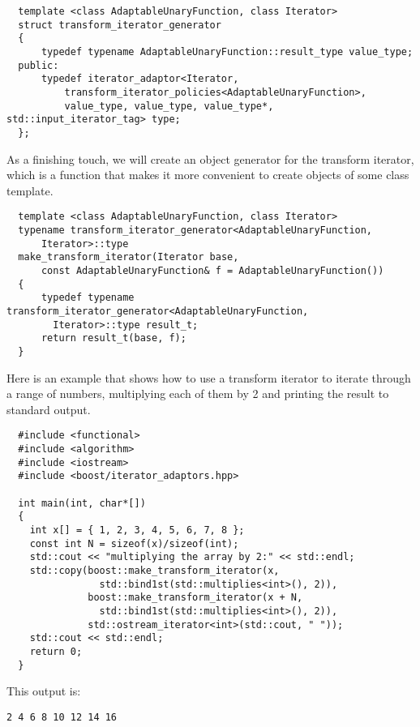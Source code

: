 \documentclass{netobjectdays}
\begin{document}
{\footnotesize
\begin{verbatim}
  template <class AdaptableUnaryFunction, class Iterator>
  struct transform_iterator_generator
  {
      typedef typename AdaptableUnaryFunction::result_type value_type;
  public:
      typedef iterator_adaptor<Iterator, 
          transform_iterator_policies<AdaptableUnaryFunction>,
          value_type, value_type, value_type*, std::input_iterator_tag> type;
  };
\end{verbatim}
}

As a finishing touch, we will create an 
\textsf{object generator} for the transform iterator, which
 is a function that makes it more convenient to create objects of some
class template.

{\footnotesize
\begin{verbatim}
  template <class AdaptableUnaryFunction, class Iterator>
  typename transform_iterator_generator<AdaptableUnaryFunction,
      Iterator>::type
  make_transform_iterator(Iterator base,
      const AdaptableUnaryFunction& f = AdaptableUnaryFunction())
  {
      typedef typename transform_iterator_generator<AdaptableUnaryFunction,
        Iterator>::type result_t;
      return result_t(base, f);
  }
\end{verbatim}
}

Here is an example that shows how to use a transform iterator to
iterate through a range of numbers, multiplying each of them by 2
and printing the result to standard output.

{\footnotesize
\begin{verbatim}
  #include <functional>
  #include <algorithm>
  #include <iostream>
  #include <boost/iterator_adaptors.hpp>

  int main(int, char*[])
  {
    int x[] = { 1, 2, 3, 4, 5, 6, 7, 8 };
    const int N = sizeof(x)/sizeof(int);
    std::cout << "multiplying the array by 2:" << std::endl;
    std::copy(boost::make_transform_iterator(x, 
                std::bind1st(std::multiplies<int>(), 2)),
              boost::make_transform_iterator(x + N, 
                std::bind1st(std::multiplies<int>(), 2)),
              std::ostream_iterator<int>(std::cout, " "));
    std::cout << std::endl;
    return 0;
  }
\end{verbatim}
}

\noindent This output is: 
{\footnotesize
\begin{verbatim}
2 4 6 8 10 12 14 16
\end{verbatim}
}



\end{document}
